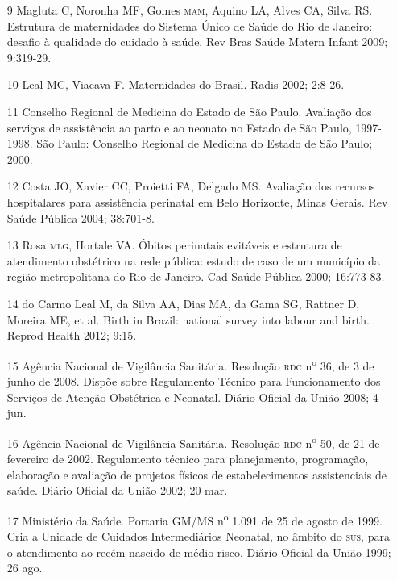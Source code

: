 \documentclass{article}
\begin{document}
\begin{itemize}
\item[9] Magluta C, Noronha MF, Gomes \textsc{mam}, Aquino LA, Alves CA, Silva RS.
Estrutura de maternidades do Sistema Único de Saúde do Rio de Janeiro: desafio à
qualidade do cuidado à saúde. Rev Bras Saúde Matern Infant 2009;
9:319-29.

\item[10] Leal MC, Viacava F. Maternidades do Brasil. Radis 2002;
2:8-26.

\item[11] Conselho Regional de Medicina do Estado de São Paulo. Avaliação
dos serviços de assistência ao parto e ao neonato no Estado de São Paulo,
1997-1998. São Paulo: Conselho Regional de Medicina do Estado de São Paulo;
2000.

\item[12] Costa JO, Xavier CC, Proietti FA, Delgado MS. Avaliação dos
recursos hospitalares para assistência perinatal em Belo Horizonte, Minas
Gerais. Rev Saúde Pública 2004; 38:701-8.

\item[13] Rosa \textsc{mlg}, Hortale VA. Óbitos perinatais evitáveis e estrutura de
atendimento obstétrico na rede pública: estudo de caso de um município da região
metropolitana do Rio de Janeiro. Cad Saúde Pública 2000;
16:773-83.

\item[14] do Carmo Leal M, da Silva AA, Dias MA, da Gama SG, Rattner D,
Moreira ME, et al. Birth in Brazil: national survey into labour and birth.
Reprod Health 2012; 9:15.

\item[15] Agência Nacional de Vigilância Sanitária. Resolução \textsc{rdc}
n\textsuperscript{o}
36, de 3 de junho de 2008. Dispõe
sobre Regulamento Técnico para Funcionamento dos Serviços de Atenção Obstétrica
e Neonatal. Diário Oficial da União 2008; 4 jun.

\item[16] Agência Nacional de Vigilância Sanitária. Resolução \textsc{rdc}
n\textsuperscript{o}
50, de 21 de fevereiro de 2002.
Regulamento técnico para planejamento, programação, elaboração e avaliação de
projetos físicos de estabelecimentos assistenciais de saúde. Diário Oficial da
União 2002; 20 mar.

\item[17] Ministério da Saúde. Portaria GM/MS
n\textsuperscript{o}
1.091 de 25 de agosto de 1999. Cria a
Unidade de Cuidados Intermediários Neonatal, no âmbito do \textsc{sus}, para o
atendimento ao recém-nascido de médio risco. Diário Oficial da União 1999; 26
ago.


\end{itemize}
\end{document}

